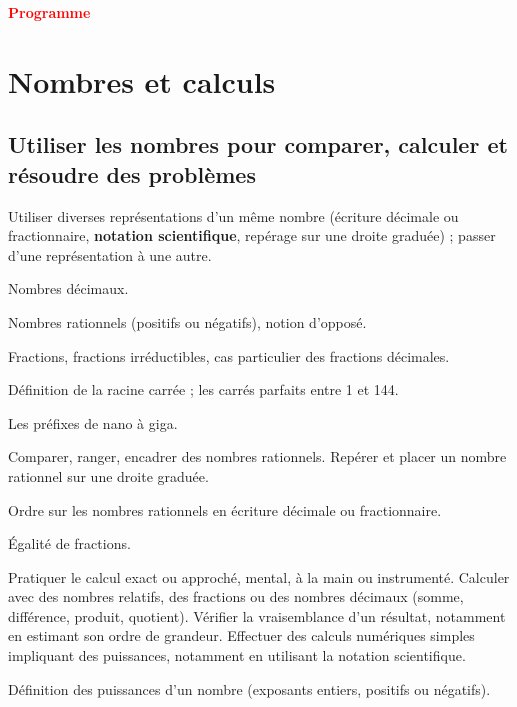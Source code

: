 \documentclass[11pt]{article}
\begin{document}
\begin{center}
	{\bf \LARGE \textcolor{red}{Programme}}
\end{center}

\section{Nombres et calculs}

\subsection{Utiliser les nombres pour comparer, calculer et résoudre des problèmes}

\begin{todolist}
    \item Utiliser diverses représentations d’un même nombre (écriture décimale ou fractionnaire, {\bf notation scientifique}, repérage sur une droite graduée) ; passer d’une représentation à une autre.
    \item[\done] Nombres décimaux.
    \item[\done] Nombres rationnels (positifs ou négatifs), notion d’opposé.
    \item[\done] Fractions, fractions irréductibles, cas particulier des fractions décimales.
    \item Définition de la racine carrée ; les carrés parfaits entre 1 et 144.
    \item Les préfixes de nano à giga.
    \item[\done] Comparer, ranger, encadrer des nombres rationnels. Repérer et placer un nombre rationnel sur une droite graduée.
    \item[\done] Ordre sur les nombres rationnels en écriture décimale ou fractionnaire.
    \item[\done] Égalité de fractions.
    \item[\done] Pratiquer le calcul exact ou approché, mental, à la main ou instrumenté. Calculer avec des nombres relatifs, des fractions ou des nombres décimaux (somme, différence, produit, quotient). Vérifier la vraisemblance d’un résultat, notamment en estimant son ordre de grandeur. Effectuer des calculs numériques simples impliquant des puissances, notamment en utilisant la notation scientifique.
    \item Définition des puissances d’un nombre (exposants entiers, positifs ou négatifs).
\end{todolist}
\end{document}
